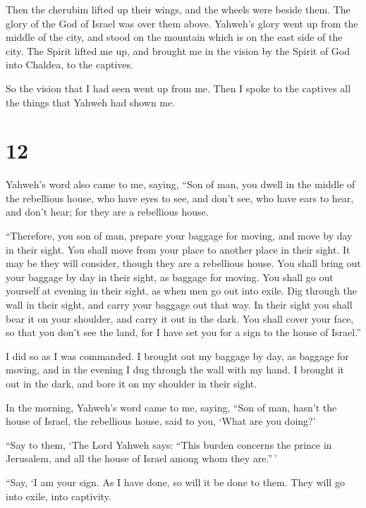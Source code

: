  Then the cherubim lifted up their wings, and the wheels
were beside them. The glory of the God of Israel was over them above.
 Yahweh's glory went up from the middle of the city, and
stood on the mountain which is on the east side of the city.
 The Spirit lifted me up, and brought me in the vision by
the Spirit of God into Chaldea, to the captives.

So the vision that I had seen went up from me.  Then I
spoke to the captives all the things that Yahweh had shown me.

\hypertarget{section-10}{%
\section{12}\label{section-10}}

 Yahweh's word also came to me, saying,  ``Son
of man, you dwell in the middle of the rebellious house, who have eyes
to see, and don't see, who have ears to hear, and don't hear; for they
are a rebellious house.

 ``Therefore, you son of man, prepare your baggage for
moving, and move by day in their sight. You shall move from your place
to another place in their sight. It may be they will consider, though
they are a rebellious house.  You shall bring out your
baggage by day in their sight, as baggage for moving. You shall go out
yourself at evening in their sight, as when men go out into exile.
 Dig through the wall in their sight, and carry your baggage
out that way.  In their sight you shall bear it on your
shoulder, and carry it out in the dark. You shall cover your face, so
that you don't see the land, for I have set you for a sign to the house
of Israel.''

 I did so as I was commanded. I brought out my baggage by
day, as baggage for moving, and in the evening I dug through the wall
with my hand. I brought it out in the dark, and bore it on my shoulder
in their sight.

 In the morning, Yahweh's word came to me, saying,
 ``Son of man, hasn't the house of Israel, the rebellious
house, said to you, `What are you doing?'

 ``Say to them, `The Lord Yahweh says: ``This burden
concerns the prince in Jerusalem, and all the house of Israel among whom
they are.''\,'

 ``Say, `I am your sign. As I have done, so will it be done
to them. They will go into exile, into captivity.

